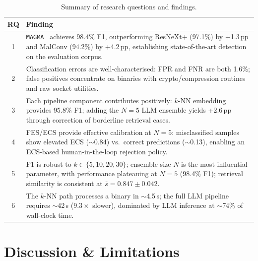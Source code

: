 \documentclass[pdflatex,sn-mathphys-num]{sn-jnl}
\newcommand{\sysname}{\texttt{MAGMA}~}
\begin{document}
\begin{table}[!htbp]
\centering
\caption{Summary of research questions and findings.}
\label{tab:summary}
\small
\begin{tabular}{@{}cp{}@{}}
\toprule
\textbf{RQ} & \textbf{Finding} \\
\midrule
1 & \sysname{} achieves 98.4\% F1, outperforming ResNeXt+ (97.1\%) by
    +1.3\,pp and MalConv (94.2\%) by +4.2\,pp, establishing
    state-of-the-art detection on the evaluation corpus. \\
2 & Classification errors are well-characterised: FPR and FNR are both
    1.6\%; false positives concentrate on binaries with crypto/compression
    routines and raw socket utilities. \\
3 & Each pipeline component contributes positively: $k$-NN embedding
    provides 95.8\% F1; adding the $N{=}5$ LLM ensemble yields
    +2.6\,pp through correction of borderline retrieval cases. \\
4 & FES/ECS provide effective calibration at $N{=}5$: misclassified
    samples show elevated ECS ($\sim$0.84) vs.\ correct predictions
    ($\sim$0.13), enabling an ECS-based human-in-the-loop rejection
    policy. \\
5 & F1 is robust to $k \in \{5,10,20,30\}$; ensemble size $N$ is the
    most influential parameter, with performance plateauing at $N{=}5$
    (98.4\% F1); retrieval similarity is consistent at
    $\bar{s} = 0.847 \pm 0.042$. \\
6 & The $k$-NN path processes a binary in $\sim$4.5\,s; the full LLM
    pipeline requires $\sim$42\,s ($9.3\times$ slower), dominated by
    LLM inference at $\sim$74\% of wall-clock time. \\
\bottomrule
\end{tabular}
\end{table}
\newpage
\section{Discussion \& Limitations}
\label{sec:discussion}
\end{document}
